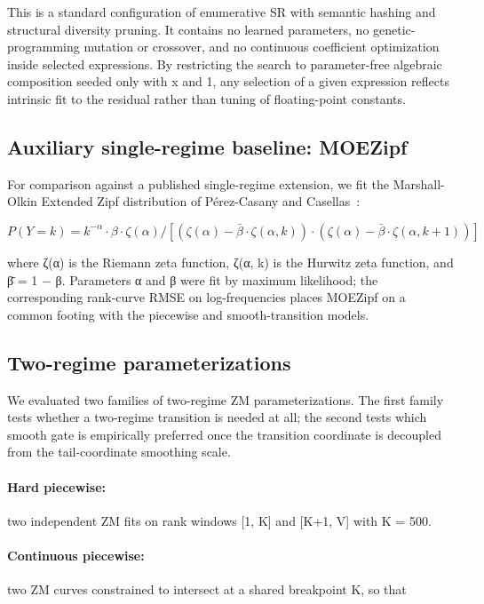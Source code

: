 \documentclass[11pt]{article}
\begin{document}
This is a standard configuration of enumerative SR with semantic hashing and structural diversity pruning. It contains no learned parameters, no genetic-programming mutation or crossover, and no continuous coefficient optimization inside selected expressions. By restricting the search to parameter-free algebraic composition seeded only with x and 1, any selection of a given expression reflects intrinsic fit to the residual rather than tuning of floating-point constants.

\subsection{Auxiliary single-regime baseline: MOEZipf}

For comparison against a published single-regime extension, we fit the Marshall-Olkin Extended Zipf distribution of Pérez-Casany and Casellas~\cite{perez2013}:

\begin{equation}
\tag{6}\label{eq:moe}
P(Y = k) = k^{-\alpha} \cdot \beta \cdot \zeta(\alpha) / [(\zeta(\alpha) - \bar{\beta}\cdot \zeta(\alpha,k)) \cdot (\zeta(\alpha) - \bar{\beta}\cdot \zeta(\alpha,k+1))]
\end{equation}

where ζ(α) is the Riemann zeta function, ζ(α, k) is the Hurwitz zeta function, and β̄ = 1 − β. Parameters α and β were fit by maximum likelihood; the corresponding rank-curve RMSE on log-frequencies places MOEZipf on a common footing with the piecewise and smooth-transition models.

\subsection{Two-regime parameterizations}

We evaluated two families of two-regime ZM parameterizations. The first family tests whether a two-regime transition is needed at all; the second tests which smooth gate is empirically preferred once the transition coordinate is decoupled from the tail-coordinate smoothing scale.

\paragraph{Hard piecewise:} two independent ZM fits on rank windows [1, K] and [K+1, V] with K = 500.

\paragraph{Continuous piecewise:} two ZM curves constrained to intersect at a shared breakpoint K, so that
\end{document}
